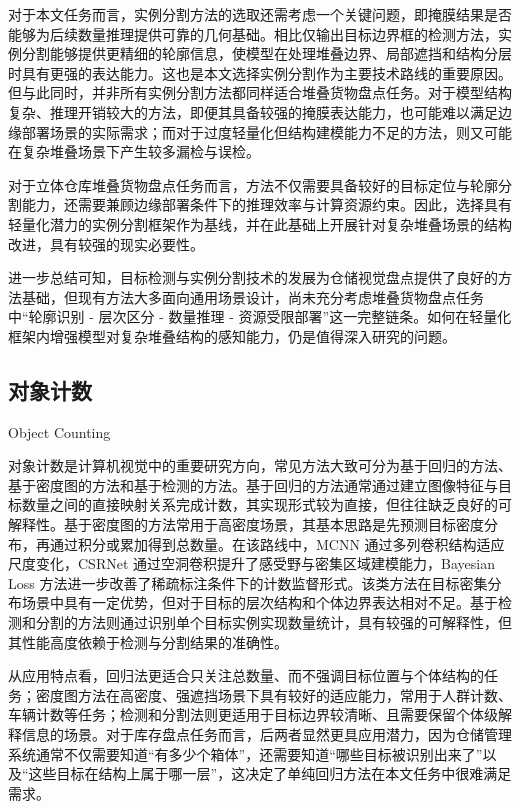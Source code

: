对于本文任务而言，实例分割方法的选取还需考虑一个关键问题，即掩膜结果是否能够为后续数量推理提供可靠的几何基础。相比仅输出目标边界框的检测方法，实例分割能够提供更精细的轮廓信息，使模型在处理堆叠边界、局部遮挡和结构分层时具有更强的表达能力。这也是本文选择实例分割作为主要技术路线的重要原因。但与此同时，并非所有实例分割方法都同样适合堆叠货物盘点任务。对于模型结构复杂、推理开销较大的方法，即便其具备较强的掩膜表达能力，也可能难以满足边缘部署场景的实际需求；而对于过度轻量化但结构建模能力不足的方法，则又可能在复杂堆叠场景下产生较多漏检与误检。

对于立体仓库堆叠货物盘点任务而言，方法不仅需要具备较好的目标定位与轮廓分割能力，还需要兼顾边缘部署条件下的推理效率与计算资源约束。因此，选择具有轻量化潜力的实例分割框架作为基线，并在此基础上开展针对复杂堆叠场景的结构改进，具有较强的现实必要性。

进一步总结可知，目标检测与实例分割技术的发展为仓储视觉盘点提供了良好的方法基础，但现有方法大多面向通用场景设计，尚未充分考虑堆叠货物盘点任务中“轮廓识别 - 层次区分 - 数量推理 - 资源受限部署”这一完整链条。如何在轻量化框架内增强模型对复杂堆叠结构的感知能力，仍是值得深入研究的问题。

\subsection{对象计数}{Object Counting}

对象计数是计算机视觉中的重要研究方向，常见方法大致可分为基于回归的方法、基于密度图的方法和基于检测的方法。基于回归的方法通常通过建立图像特征与目标数量之间的直接映射关系完成计数，其实现形式较为直接，但往往缺乏良好的可解释性\cite{chattopadhyay2017counting}。基于密度图的方法常用于高密度场景，其基本思路是先预测目标密度分布，再通过积分或累加得到总数量\cite{lempitsky2010count,zhang2015crossscene}。在该路线中，MCNN 通过多列卷积结构适应尺度变化，CSRNet 通过空洞卷积提升了感受野与密集区域建模能力，Bayesian Loss 方法进一步改善了稀疏标注条件下的计数监督形式\cite{zhang2016mcnn,li2018csrnet,ma2019bayesiancrowd}。该类方法在目标密集分布场景中具有一定优势，但对于目标的层次结构和个体边界表达相对不足。基于检测和分割的方法则通过识别单个目标实例实现数量统计，具有较强的可解释性，但其性能高度依赖于检测与分割结果的准确性\cite{cohen2017countception,chattopadhyay2017counting}。

从应用特点看，回归法更适合只关注总数量、而不强调目标位置与个体结构的任务；密度图方法在高密度、强遮挡场景下具有较好的适应能力，常用于人群计数、车辆计数等任务；检测和分割法则更适用于目标边界较清晰、且需要保留个体级解释信息的场景。对于库存盘点任务而言，后两者显然更具应用潜力，因为仓储管理系统通常不仅需要知道“有多少个箱体”，还需要知道“哪些目标被识别出来了”以及“这些目标在结构上属于哪一层”，这决定了单纯回归方法在本文任务中很难满足需求。

